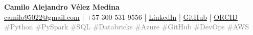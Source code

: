 \begin{center}
    {\LARGE \textbf{Camilo Alejandro Vélez Medina}} \\
    \vspace{0.3em}
    \href{mailto:camilo95022@gmail.com}{camilo95022@gmail.com} \quad | \quad
    +57 300 531 9556 \quad | \quad
    \href{https://www.linkedin.com/in/camilo-alejandro-v%C3%A9lez-medina-1b447a144}{LinkedIn} \quad | \quad
    \href{https://github.com/Camilovelez1}{GitHub} \quad | \quad
    \href{https://orcid.org/0009-0000-8515-2545}{ORCID} \\
    \vspace{0.5em}
    \small
    \textcolor{gray}{
        \#Python \quad \#PySpark \quad \#SQL \quad \#Databricks \quad \#Azure \quad \#GitHub \quad \#DevOps \quad \#AWS
    }
\end{center}
